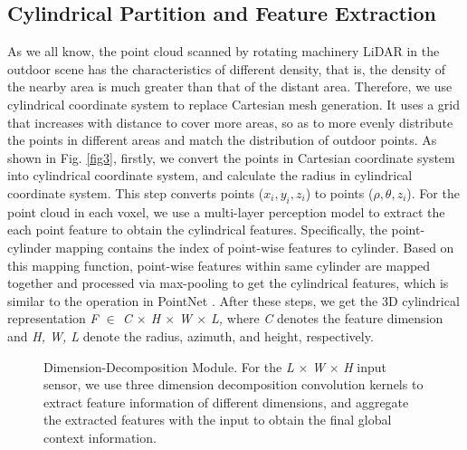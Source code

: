 \documentclass[lettersize,journal]{IEEEtran}
\begin{document}
\subsection{Cylindrical Partition and Feature Extraction}
As we all know, the point cloud scanned by rotating machinery LiDAR in the outdoor scene has the characteristics of different density, that is, the density of the nearby area is much greater than that of the distant area. Therefore, we use cylindrical coordinate system to replace Cartesian mesh generation. It uses a grid that increases with distance to cover more areas, so as to more evenly distribute the points in different areas and match the distribution of outdoor points. As shown in Fig. \ref{fig3},  firstly, we convert the points in Cartesian coordinate system into cylindrical coordinate system, and calculate the radius in cylindrical coordinate system. This step converts points ($x_i, y_i, z_i$) to points ($\rho, \theta, z_i$). For the point cloud in each voxel, we use a multi-layer perception model to extract the each point feature to obtain the cylindrical features. Specifically, the point-cylinder mapping contains the index of point-wise features to cylinder. Based on this mapping function, point-wise features within same cylinder are mapped together and processed via max-pooling to get the cylindrical features, which is similar to the operation in PointNet \cite{qi2017pointnet++}. After these steps, we get the 3D cylindrical representation \emph{F $\in$ C $\times$ H $\times$ W $\times$ L,} where \emph{C} denotes the feature dimension and \emph{H, W, L} denote the radius, azimuth, and height, respectively.

\begin{figure}[t]
\centering
\vskip 0.2in
\caption{Dimension-Decomposition Module. For the \emph{L} $\times$ \emph{W} $\times$ \emph{H} input sensor, we use three dimension decomposition convolution kernels to extract feature information of different dimensions, and aggregate the extracted features with the input to obtain the final global context information.}
\label{fig.DDCM}
\end{figure}
\end{document}
